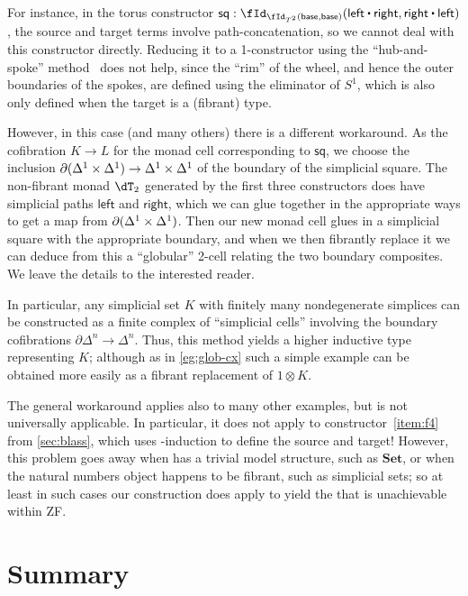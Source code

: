 \documentclass{amsart}
\let\N\iN
\let\sec\S
\let\S\cS
\begin{document}
For instance, in the torus constructor $\mathsf{sq} : \id[{\id[T^2]{\mathsf{base}}{\mathsf{base}}}]{\mathsf{left}\ct\mathsf{right}}{\mathsf{right}\ct\mathsf{left}}$, the source and target terms involve path-concatenation, so we cannot deal with this constructor directly.
Reducing it to a 1-constructor using the ``hub-and-spoke'' method~\cite[\sec6.7]{hottbook} does not help, since the ``rim'' of the wheel, and hence the outer boundaries of the spokes, are defined using the eliminator of $S^1$, which is also only defined when the target is a (fibrant) type.

However, in this case (and many others) there is a different workaround.
As the cofibration $K\to L$ for the monad cell corresponding to $\mathsf{sq}$, we choose the inclusion $\partial({\Delta^1}\times{\Delta^1}) \to {\Delta^1}\times{\Delta^1}$ of the boundary of the simplicial square.
The non-fibrant monad $\dT_2$ generated by the first three constructors does have simplicial paths $\mathsf{left}$ and $\mathsf{right}$, which we can glue together in the appropriate ways to get a map from $\partial({\Delta^1}\times{\Delta^1})$.
Then our new monad cell glues in a simplicial square with the appropriate boundary, and when we then fibrantly replace it we can deduce from this a ``globular'' 2-cell relating the two boundary composites.
We leave the details to the interested reader.

In particular, any simplicial set $K$ with finitely many nondegenerate simplices can be constructed as a finite complex of ``simplicial cells'' involving the boundary cofibrations $\partial\Delta^n \to \Delta^n$.
Thus, this method yields a higher inductive type representing $K$; although as in \cref{eg:glob-cx} such a simple example can be obtained more easily as a fibrant replacement of $1\otimes K$.

The general workaround applies also to many other examples, but is not universally applicable.
In particular, it does not apply to constructor~\ref{item:f4} from \cref{sec:blass}, which uses \N-induction to define the source and target!
However, this problem goes away when \sM has a trivial model structure, such as $\mathbf{Set}$, or when the natural numbers object happens to be fibrant, such as simplicial sets; so at least in such cases our construction does apply to yield the \iF that is unachievable within ZF.

\section{Summary}
\label{sec:summary}
\end{document}
